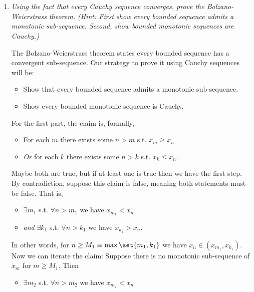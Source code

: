 \documentclass{article}
\begin{document}
\displayoptions

\section{}

\begin{enumerate}[1.]
  \item \textit{Using the fact that every Cauchy sequence converges, prove the Bolzano-Weierstrass theorem. (Hint: First show every bounded sequence admits a monotonic sub-sequence. Second, show bounded monotonic sequences are Cauchy.)}

    \solution The Bolzano-Weierstrass theorem states every bounded sequence has a convergent sub-sequence. Our strategy to prove it using Cauchy sequences will be:
    \begin{itemize}[label=$\bullet$]
      \item Show that every bounded sequence admits a monotonic sub-sequence.

      \item Show every bounded monotonic sequence is Cauchy.
    \end{itemize}

    For the first part, the claim is, formally,
    \begin{itemize}[label=$\bullet$]
      \item For each $m$ there exists some $n > m$ s.t. $x_m \ge x_n$

      \item \textit{Or} for each $k$ there exists some $n > k$ s.t. $x_k \le x_n$.
    \end{itemize}

    Maybe both are true, but if at least one is true then we have the first step. By contradiction, suppose this claim is false, meaning both statements must be false. That is,
    \begin{itemize}[label=$\bullet$]
      \item $\exists m_1$ s.t. $\forall n > m_1$ we have $x_{m_1} < x_n$

      \item \textit{and} $\exists k_1$ s.t. $\forall n > k_1$ we have $x_{k_1} > x_n$.
    \end{itemize}

    In other words, for $n \ge M_1 \equiv \max\set{m_1, k_1}$ we have $x_n \in (x_{m_1}, x_{k_1})$. Now we can iterate the claim: Suppose there is no monotonic sub-sequence of $x_m$ for $m \ge M_1$. Then
    \begin{itemize}[label=$\bullet$]
      \item $\exists m_2$ s.t. $\forall n > m_2$ we have $x_{m_2} < x_n$


\end{itemize}
\end{enumerate}
\end{document}
